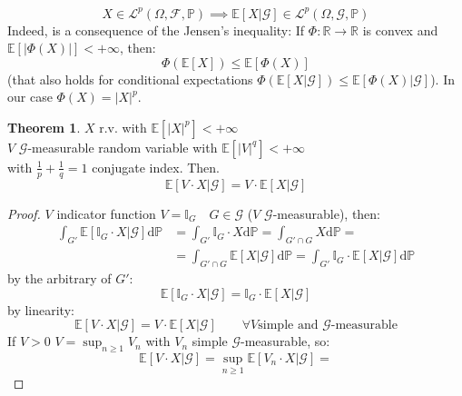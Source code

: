 \documentclass[10pt,a4paper]{article}
\theoremstyle{definition}
\newtheorem{teo}{Theorem}[section]
\begin{document}
\begin{enumerate}
\begin{equation*}
	X \in \mathcal{L}^p(\Omega,\mathcal{F},\mathbb{P})\implies \mathbb{E}[X|\mathcal{G}]\in \mathcal{L}^p(\Omega,\mathcal{G},\mathbb{P})
\end{equation*}
Indeed, is a consequence of the Jensen's inequality:
If $\Phi : \mathbb{R}\to\mathbb{R}$ is convex and $\mathbb{E}[|\Phi(X)|]<+\infty $, then:
\begin{equation*}
\Phi(\mathbb{E}[X])\leq\mathbb{E}[\Phi(X)]
\end{equation*}
(that also holds for conditional expectations $\Phi(\mathbb{E}[X|\mathcal{G}])\leq\mathbb{E}[\Phi(X)|\mathcal{G}]$). In our case $ \Phi(X)=|X|^p$.
\begin{teo}
	$X$ r.v. with $\mathbb{E}[|X|^p]<+\infty $\\
	$V$ $\mathcal{G}$-measurable random variable with $\mathbb{E}[|V|^q]<+\infty$\\
	with $\frac{1}{p}+\frac{1}{q}=1$ conjugate index.
	Then.
	\begin{equation*}
		\mathbb{E}[V\cdot X|\mathcal{G}]=V\cdot \mathbb{E}[X|\mathcal{G}]
	\end{equation*}
\end{teo}
\begin{proof}
	$V$ indicator function $V=\mathbb{I}_G \quad G\in\mathcal{G}$ ($V$ $\mathcal{G}$-measurable), then:
\begin{equation*}
	\begin{split}
		\int_{G'}\mathbb{E}[\mathbb{I}_G \cdot X|\mathcal{G}]\mathrm{d}\mathbb{P}&=
		\int_{G'}\mathbb{I}_G \cdot X\mathrm{d}\mathbb{P}=
		\int_{G'\cap G}X\mathrm{d}\mathbb{P}=\\
		&=\int_{G'\cap G}\mathbb{E}[X|\mathcal{G}]\mathrm{d}\mathbb{P}=
		\int_{G'}\mathbb{I}_G \cdot\mathbb{E}[ X|\mathcal{G}]\mathrm{d}\mathbb{P}
	\end{split}
\end{equation*}
by the arbitrary of $G'$: 
	\begin{equation*}
	\mathbb{E}[\mathbb{I}_G\cdot X|\mathcal{G}]=\mathbb{I}_G\cdot \mathbb{E}[X|\mathcal{G}]
\end{equation*}
by linearity:
\begin{equation*}
	\mathbb{E}[V\cdot X|\mathcal{G}]=V\cdot \mathbb{E}[X|\mathcal{G}] \qquad\forall V \text{simple and  $\mathcal{G}$-measurable}  
\end{equation*} 
If $V>0$  $V=\sup_{n\geq 1}V_n$ with $V_n$ simple   $\mathcal{G}$-measurable, so:
\begin{equation*}
	\mathbb{E}[V\cdot X|\mathcal{G}]=
	\sup_{n\geq 1}\mathbb{E}[V_n\cdot X|\mathcal{G}]=

\end{equation*}
\end{proof}
\end{enumerate}
\end{document}
